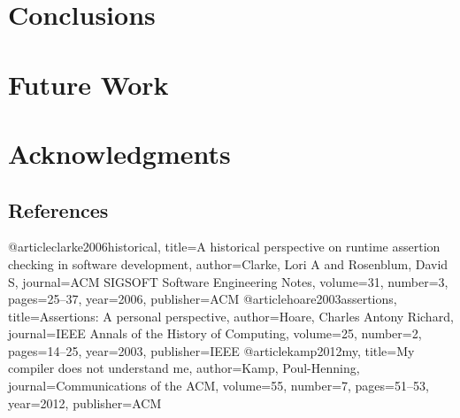 \documentclass{sig-alternate}
\begin{document}
\section{Conclusions}

\section{Future Work}

\section{Acknowledgments}
\subsection{References}
\begin{thebibliography}{9}
\bibitem @article{clarke2006historical,
  title={A historical perspective on runtime assertion checking in software development},
  author={Clarke, Lori A and Rosenblum, David S},
  journal={ACM SIGSOFT Software Engineering Notes},
  volume={31},
  number={3},
  pages={25--37},
  year={2006},
  publisher={ACM}
}
\bibitem @article{hoare2003assertions,
  title={Assertions: A personal perspective},
  author={Hoare, Charles Antony Richard},
  journal={IEEE Annals of the History of Computing},
  volume={25},
  number={2},
  pages={14--25},
  year={2003},
  publisher={IEEE}
}
\bibitem @article{kamp2012my,
  title={My compiler does not understand me},
  author={Kamp, Poul-Henning},
  journal={Communications of the ACM},
  volume={55},
  number={7},
  pages={51--53},
  year={2012},
  publisher={ACM}
}
\end{thebibliography}
\end{document}
